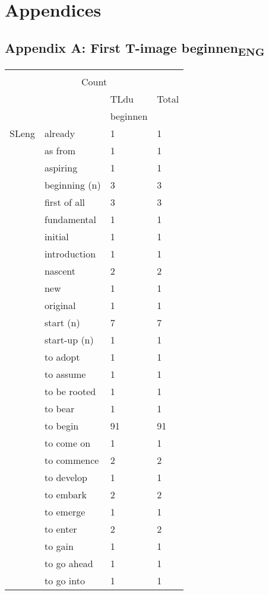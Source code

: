 \chapter{Appendices} 

\section{Appendix A: First T-image beginnen\textsubscript{ENG}}
\begin{tabularx}{\textwidth}{XXXX}
\lsptoprule
\multicolumn{4}{c}{ SLeng * TLdu Crosstabulation}\\
\multicolumn{4}{c}{Count} \\
\multicolumn{2}{c}{} & TLdu & Total\\
\hhline{~~--} &  & beginnen & \\
\multicolumn{1}{c}{SLeng} & already &  1 &  1\\
& as from &  1 &  1\\
& aspiring &  1 &  1\\
& beginning (n) &  3 &  3\\
& first of all &  3 &  3\\
& fundamental &  1 &  1\\
& initial &  1 &  1\\
& introduction &  1 &  1\\
& nascent &  2 &  2\\
& new &  1 &  1\\
& original &  1 &  1\\
& start (n) &  7 &  7\\
& start-up (n) &  1 &  1\\
& to adopt &  1 &  1\\
& to assume &  1 &  1\\
& to be rooted &  1 &  1\\
& to bear &  1 &  1\\
& to begin &  91 &  91\\
& to come on &  1 &  1\\
& to commence &  2 &  2\\
& to develop &  1 &  1\\
& to embark &  2 &  2\\
& to emerge &  1 &  1\\
& to enter &  2 &  2\\
& to gain &  1 &  1\\
& to go ahead &  1 &  1\\
& to go into &  1 &  1\\

\end{tabularx}
